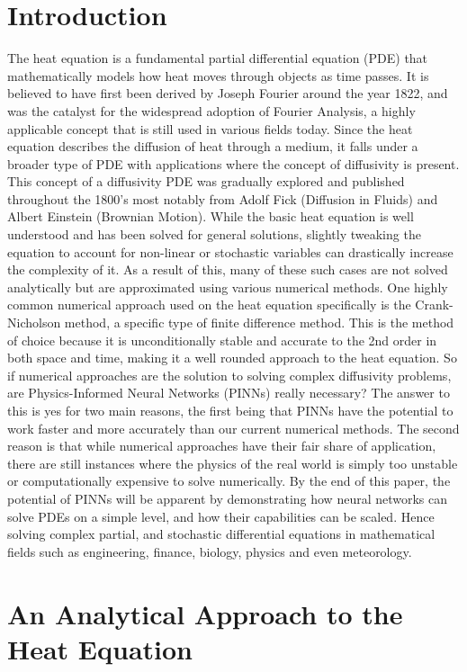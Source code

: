 \documentclass[12pt, reqno]{amsart}
\begin{document}
\section{Introduction}
The heat equation is a fundamental partial differential equation (PDE) that mathematically models how heat moves through objects as time passes. It is believed to have first been derived by Joseph Fourier around the year 1822, and was the catalyst for the widespread adoption of Fourier Analysis, a highly applicable concept that is still used in various fields today. Since the heat equation describes the diffusion of heat through a medium, it falls under a broader type of PDE with applications where the concept of diffusivity is present. This concept of a diffusivity PDE was gradually explored and published throughout the 1800's most notably from Adolf Fick (Diffusion in Fluids) and Albert Einstein (Brownian Motion). While the basic heat equation is well understood and has been solved for general solutions, slightly tweaking the equation to account for non-linear or stochastic variables can drastically increase the complexity of it. As a result of this, many of these such cases are not solved analytically but are approximated using various numerical methods. One highly common numerical approach used on the heat equation specifically is the Crank-Nicholson method, a specific type of finite difference method. This is the method of choice because it is unconditionally stable and accurate to the 2nd order in both space and time, making it a well rounded approach to the heat equation. So if numerical approaches are the solution to solving complex diffusivity problems, are Physics-Informed Neural Networks (PINNs) really necessary? The answer to this is yes for two main reasons, the first being that PINNs have the potential to work faster and more accurately than our current numerical methods. The second reason is that while numerical approaches have their fair share of application, there are still instances where the physics of the real world is simply too unstable or computationally expensive to solve numerically. By the end of this paper, the potential of PINNs will be apparent by demonstrating how neural networks can solve PDEs on a simple level, and how their capabilities can be scaled. Hence solving complex partial, and stochastic differential equations in mathematical fields such as engineering, finance, biology, physics and even meteorology.
\textbf{}
\section{An Analytical Approach to the Heat Equation}
\end{document}
